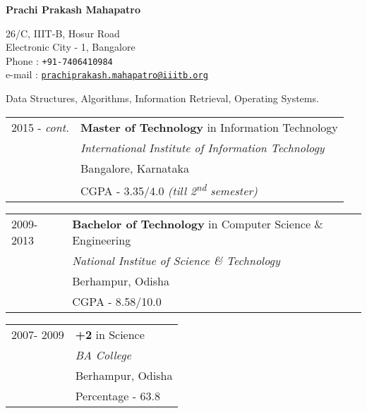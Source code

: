 \documentclass[10pt]{article}
\newcommand{\shadethis}[1]{ \begin{snugshade}#1\end{snugshade}}
\begin{document}
	
	
	\begin{center}
		\textbf{\Large Prachi Prakash Mahapatro}
		\begin{center}
			26/C, IIIT-B, Hosur Road \\
			Electronic City - 1, Bangalore \\
			Phone : \texttt{+91-7406410984}\\
			e-mail : \href{prachiprakash.mahapatro@iiitb.org}{\texttt{prachiprakash.mahapatro@iiitb.org}}\\
		\end{center} 

	\end{center}
	

	\begin{description}[style=nextline]
		
		\shadethis{\item{}}
		
			Data Structures,  Algorithms, Information Retrieval, Operating Systems.
		
		\shadethis{\item{}}
			\begin{tabular}{p{2cm}|p{10cm}}
			{2015 - \emph{cont.}} & \textbf{Master of Technology} in Information Technology\\
			  		& \emph{International Institute of Information Technology}\\
					& Bangalore, Karnataka \\
					& {CGPA - 3.35/4.0 \emph{(till 2\textsuperscript{nd} semester)}} 
					
			\end{tabular}
			
			\begin{tabular}{p{2cm}|p{10cm}}

			{2009- 2013} 	& \textbf{Bachelor of Technology} in Computer Science \& Engineering \\
			 	& \emph{National Institue of Science \& Technology} \\
				& Berhampur, Odisha\\
				& {CGPA - 8.58/10.0}		
			\end{tabular}
		
		\begin{tabular}{p{2cm}|p{10cm}}

			{2007- 2009} 	& \textbf{+2} in Science \\
			 	& \emph{BA College} \\
				& Berhampur, Odisha\\
				& {Percentage - 63.8}		
			\end{tabular}
			

\end{description}
\end{document}
